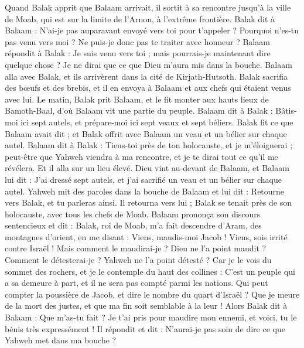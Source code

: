 \begin{multicols}{2}
Quand Balak apprit que Balaam arrivait, il sortit à sa rencontre jusqu'à la ville de Moab, qui est sur la limite de l'Arnon, à l'extrême frontière.
Balak dit à Balaam : N'ai-je pas auparavant envoyé vers toi pour t'appeler ? Pourquoi n'es-tu pas venu vers moi ? Ne puis-je donc pas te traiter avec honneur ?
Balaam répondit à Balak : Je suis venu vers toi ; mais pourrais-je maintenant dire quelque chose ? Je ne dirai que ce que Dieu m'aura mis dans la bouche.
Balaam alla avec Balak, et ils arrivèrent dans la cité de Kirjath-Hutsoth.
Balak sacrifia des bœufs et des brebis, et il en envoya à Balaam et aux chefs qui étaient venus avec lui.
Le matin, Balak prit Balaam, et le fit monter aux hauts lieux de Bamoth-Baal, d'où Balaam vit une partie du peuple.
\VerseOne{}Balaam dit à Balak : Bâtis-moi ici sept autels, et prépare-moi ici sept veaux et sept béliers.
Balak fit ce que Balaam avait dit ; et Balak offrit avec Balaam un veau et un bélier sur chaque autel.
Balaam dit à Balak : Tiens-toi près de ton holocauste, et je m'éloignerai ; peut-être que Yahweh viendra à ma rencontre, et je te dirai tout ce qu'il me révélera. Et il alla sur un lieu élevé.
Dieu vint au-devant de Balaam, et Balaam lui dit : J'ai dressé sept autels, et j'ai sacrifié un veau et un bélier sur chaque autel.
Yahweh mit des paroles dans la bouche de Balaam et lui dit : Retourne vers Balak, et tu parleras ainsi.
Il retourna vers lui ; Balak se tenait près de son holocauste, avec tous les chefs de Moab.
Balaam prononça son discours sentencieux et dit : Balak, roi de Moab, m'a fait descendre d'Aram, des montagnes d'orient, en me disant : Viens, maudis-moi Jacob ! Viens, sois irrité contre Israël !
Mais comment le maudirai-je ? Dieu ne l'a point maudit ? Comment le détesterai-je ? Yahweh ne l'a point détesté ?
Car je le vois du sommet des rochers, et je le contemple du haut des collines : C'est un peuple qui a sa demeure à part, et il ne sera pas compté parmi les nations.
Qui peut compter la poussière de Jacob, et dire le nombre du quart d'Israël ? Que je meure de la mort des justes, et que ma fin soit semblable à la leur !
Alors Balak dit à Balaam : Que m'as-tu fait ? Je t'ai pris pour maudire mon ennemi, et voici, tu le bénis très expressément !
Il répondit et dit : N'aurai-je pas soin de dire ce que Yahweh met dans ma bouche ?

\end{multicols}
